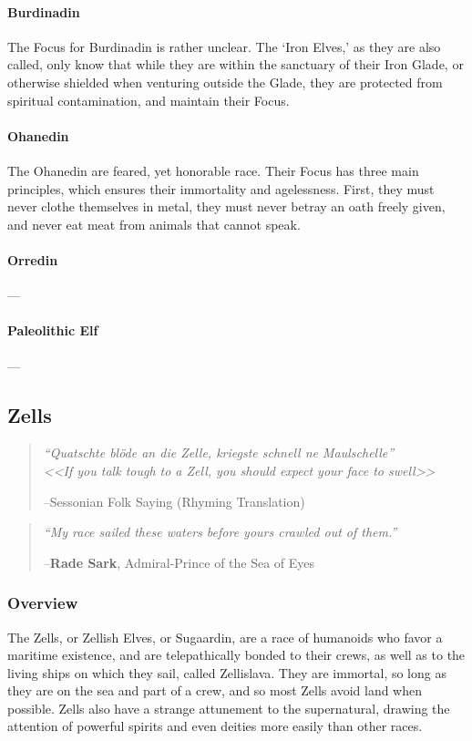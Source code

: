 \documentclass[oneside,11pt,english]{book}
\begin{document}
\paragraph*{Burdinadin}
The Focus for Burdinadin is rather unclear. The ‘Iron Elves,’ as they are also called, only know that while they are within the sanctuary of their Iron Glade, or otherwise shielded when venturing outside the Glade, they are protected from spiritual contamination, and maintain their Focus.

\paragraph*{Ohanedin}
The Ohanedin are feared, yet honorable race. Their Focus has three main principles, which ensures their immortality and agelessness. First, they must never clothe themselves in metal, they must never betray an oath freely given, and never eat meat from animals that cannot speak.

\paragraph*{Orredin}---%

\paragraph*{Paleolithic Elf}---

\subsection{Zells}
\begin{quote}
	\centering
		\emph{“Quatschte blöde an die Zelle, kriegste schnell ne Maulschelle”}\\
		\emph{<<\emph{If you talk tough to a Zell, you should expect your face to swell}>>}\par
\hfill --Sessonian Folk Saying (Rhyming Translation)
\end{quote}

\begin{quote}
	\centering
		\emph{“My race sailed these waters before yours crawled out of them.”}\par
		\hfill --\textbf{Rade Sark}, Admiral-Prince of the Sea of Eyes
\end{quote}
 
\subsubsection*{Overview} 
The Zells, or Zellish Elves, or Sugaardin, are a race of humanoids who favor a maritime existence, and are telepathically bonded to their crews, as well as to the living ships on which they sail, called Zellislava. They are immortal, so long as they are on the sea and part of a crew, and so most Zells avoid land when possible. Zells also have a strange attunement to the supernatural, drawing the attention of powerful spirits and even deities more easily than other races. 
\end{document}
